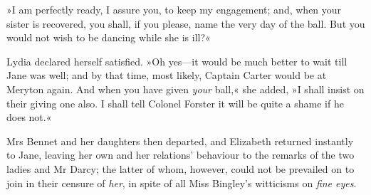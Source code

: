 »I am perfectly ready, I assure you, to keep my engagement; and, when your sister is recovered, you shall, if you please, name the very day of the ball. But you would not wish to be dancing while she is ill?«

Lydia declared herself satisfied. »Oh yes—it would be much better to wait till Jane was well; and by that time, most likely, Captain Carter would be at Meryton again. And when you have given \textit{your} ball,« she added, »I shall insist on their giving one also. I shall tell Colonel Forster it will be quite a shame if he does not.«

Mrs Bennet and her daughters then departed, and Elizabeth returned instantly to Jane, leaving her own and her relations' behaviour to the remarks of the two ladies and Mr Darcy; the latter of whom, however, could not be prevailed on to join in their censure of \textit{her}, in spite of all Miss Bingley's witticisms on \textit{fine eyes}.